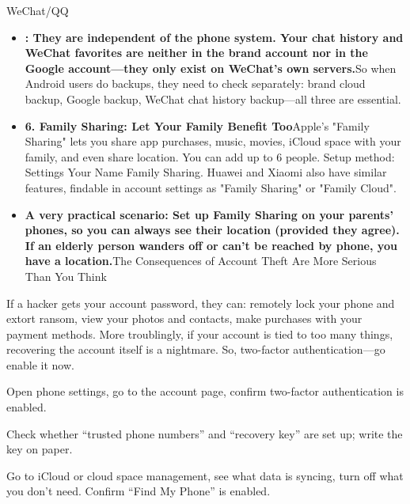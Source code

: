 
WeChat/QQ

\begin{itemize}
  \item \textbf{: They are independent of the phone system. Your chat history and WeChat favorites are neither in the brand account nor in the Google account—they only exist on WeChat's own servers.}So when Android users do backups, they need to check separately: brand cloud backup, Google backup, WeChat chat history backup—all three are essential.
  \item \textbf{6. Family Sharing: Let Your Family Benefit Too}Apple's "Family Sharing" lets you share app purchases, music, movies, iCloud space with your family, and even share location. You can add up to 6 people. Setup method: Settings Your Name Family Sharing. Huawei and Xiaomi also have similar features, findable in account settings as "Family Sharing" or "Family Cloud".
  \item \textbf{A very practical scenario: Set up Family Sharing on your parents' phones, so you can always see their location (provided they agree). If an elderly person wanders off or can't be reached by phone, you have a location.}The Consequences of Account Theft Are More Serious Than You Think
\end{itemize}

If a hacker gets your account password, they can: remotely lock your phone and extort ransom, view your photos and contacts, make purchases with your payment methods. More troublingly, if your account is tied to too many things, recovering the account itself is a nightmare. So, two-factor authentication—go enable it now.


Open phone settings, go to the account page, confirm two-factor authentication is enabled.

Check whether “trusted phone numbers” and “recovery key” are set up; write the key on paper.

\begin{tcbwarn}{Go to iCloud or cloud space management, see what data is syncing, turn off what you don't need.}
Confirm “Find My Phone” is enabled.

\end{tcbwarn}

